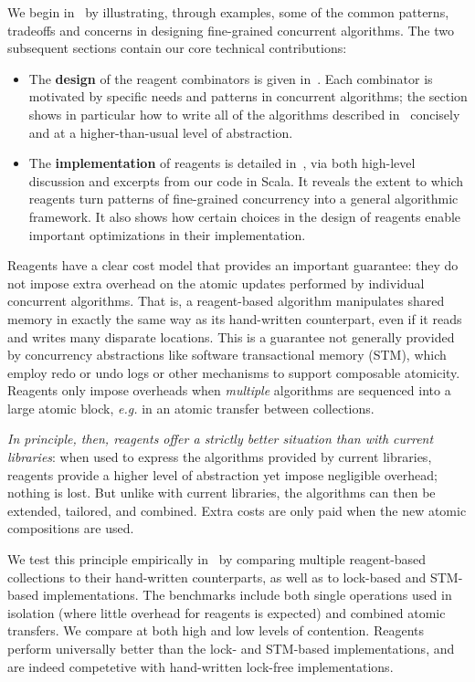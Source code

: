 \documentclass[preprint,nocopyrightspace]{sigplanconf}
\begin{document}
\vskip 6pt
\noindent
We begin in~ by illustrating, through examples, some of the
common patterns, tradeoffs and concerns in designing fine-grained concurrent
algorithms.  The two subsequent sections contain our core technical
contributions:
\begin{itemize}
\item The \textbf{design} of the reagent combinators is given
  in~.  Each combinator is motivated by specific needs and
  patterns in concurrent algorithms; the section shows in
  particular how to write all of the algorithms described in~
  concisely and at a higher-than-usual level of abstraction.
\item The \textbf{implementation} of reagents is detailed
  in~, via both high-level discussion and excerpts from
  our code in Scala.  It reveals the extent to which reagents turn patterns of
  fine-grained concurrency into a general algorithmic framework.  It also shows
  how certain choices in the design of reagents enable important optimizations
  in their implementation.
\end{itemize}
Reagents have a clear cost model that provides an important guarantee: they do
not impose extra overhead on the atomic updates performed by individual
concurrent algorithms.  That is, a reagent-based algorithm manipulates shared
memory in exactly the same way as its hand-written counterpart, even if it reads
and writes many disparate locations.  This is a guarantee not generally provided
by concurrency abstractions like software transactional memory (STM), which
employ redo or undo logs or other mechanisms to support composable atomicity.
Reagents only impose overheads when \emph{multiple} algorithms are sequenced
into a large atomic block, \emph{e.g.}  in an atomic transfer between
collections.

\emph{In principle, then, reagents offer a strictly better situation than with
  current libraries}: when used to express the algorithms provided by current
libraries, reagents provide a higher level of abstraction yet impose negligible
overhead; nothing is lost.  But unlike with current libraries, the algorithms
can then be extended, tailored, and combined.  Extra costs are only paid when
the new atomic compositions are used.  

We test this principle empirically in~ by comparing multiple
reagent-based collections to their hand-written counterparts, as well as to
lock-based and STM-based implementations.  The benchmarks include both single
operations used in isolation (where little overhead for reagents is expected)
and combined atomic transfers.  We compare at both high and low levels of
contention.  Reagents perform universally better than the lock- and STM-based
implementations, and are indeed competetive with hand-written lock-free
implementations.
\end{document}
